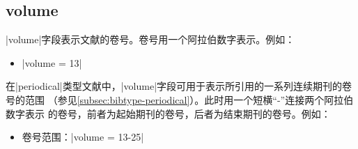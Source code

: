 
\subsection{volume}\label{subsec:bibfield-volume}

|volume|字段表示文献的卷号。卷号用一个阿拉伯数字表示。例如：
\begin{itemize}
\item |volume = {13}|
\end{itemize}

在|periodical|类型文献中，|volume|字段可用于表示所引用的一系列连续期刊的卷号的范围
（参见\ref{subsec:bibtype-periodical}）。此时用一个短横``-''连接两个阿拉伯数字表示
的卷号，前者为起始期刊的卷号，后者为结束期刊的卷号。例如：
\begin{itemize}
\item 卷号范围：|volume = {13-25}|
\end{itemize}
